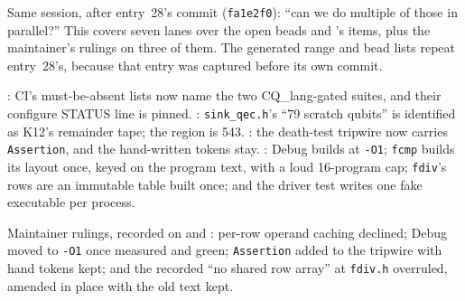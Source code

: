 
Same session, after entry~28's commit (\texttt{fa1e2f0}): ``can we do
multiple of those in parallel?'' This covers seven lanes over the open beads
and 's items, plus the maintainer's rulings on three of them. The
generated range and bead lists repeat entry~28's, because that entry was
captured before its own commit.

: CI's must-be-absent lists now name the two CQ\_lang-gated suites,
and their configure STATUS line is pinned. : \texttt{sink\_qec.h}'s
``79 scratch qubits'' is identified as K12's remainder tape; the region is
543. : the death-test tripwire now carries \texttt{Assertion}, and
the hand-written tokens stay. : Debug builds at \texttt{-O1};
\texttt{fcmp} builds its layout once, keyed on the program text, with a loud
16-program cap; \texttt{fdiv}'s rows are an immutable table built once; and
the driver test writes one fake executable per process.

\begin{figures}
\end{figures}

Maintainer rulings, recorded on  and : per-row operand
caching declined; Debug moved to \texttt{-O1} once measured and green;
\texttt{Assertion} added to the tripwire with hand tokens kept; and the
recorded ``no shared row array'' at \texttt{fdiv.h} overruled, amended in
place with the old text kept.


